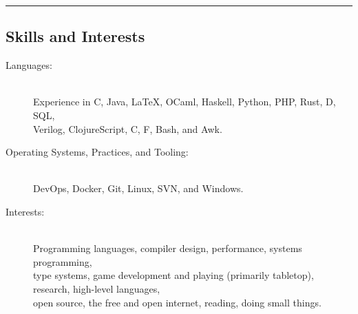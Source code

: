 \documentclass[10pt,letterpaper]{article}
\newenvironment{indentsection}[1]%
{\begin{list}{}%
  {\setlength{\leftmargin}{#1}}%
  \item[]%
}
{\end{list}}
\newcommand{\CPP}
{C\nolinebreak[4]\hspace{-.05em}\raisebox{.22ex}{\footnotesize\bf ++}}
\newcommand{\CS}{C\nolinebreak\hspace{-.05em}\raisebox{.6ex}{\scriptsize\bf \#}}
\newcommand{\FS}{F\nolinebreak\hspace{-.05em}\raisebox{.6ex}{\scriptsize\bf \#}}
\begin{document}
\hrule
\vspace{-0.4em}
\subsection*{Skills and Interests}

\begin{indentsection}{\parindent}
\begin{description}
  \item[Languages:] \ \\
  Experience in \CPP , Java, \LaTeX, OCaml, Haskell, Python, PHP, Rust, D, SQL, \\  Verilog, ClojureScript, \CS, \FS, Bash, and Awk.
  \item[Operating Systems, Practices, and Tooling:] \ \\
  DevOps, Docker, Git, Linux, SVN, and Windows.
  \item[Interests:] \ \\
  Programming languages, compiler design, performance, systems programming, \\ type systems, game development and playing (primarily tabletop), research, high-level languages, \\ open source, the free and open internet, reading, doing small things.
\end{description}
\end{indentsection}
\end{document}
